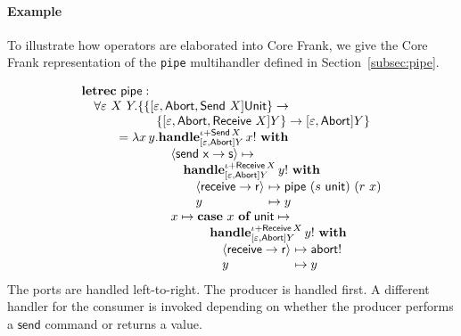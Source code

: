 \documentclass[12pt]{article}
\makeatletter
\newcommand\ba{\begin{array}}
\newcommand\ea{\end{array}}
\newcommand{\bl}{\ba[t]{@{}l@{}}}
\newcommand{\el}{\ea}
\newcommand{\effbox}[1]{[#1]}
\newcommand{\key}[1]{\textbf{#1}} %
\newcommand{\op}{\mathsf}  %
\newcommand{\con}{\mathsf} %
\newcommand{\inter}{\mathsf} %
\newcommand{\handleSymbol}{\rightarrow}
\newcommand{\handle}[2]{{#1} \handleSymbol {#2}}
\newcommand{\thunk}[1]{\{{#1}\}}
\newcommand{\evd}{\varepsilon}
\newcommand{\effin}[1]{\langle {#1} \rangle}
\newcommand{\id}{\iota}
\makeatother
\begin{document}
\paragraph{Example}
To illustrate how operators are elaborated into Core Frank, we give
the Core Frank representation of the \verb!pipe! multihandler defined
in Section~\ref{subsec:pipe}.

\[
\bl
\key{letrec}~
  \op{pipe} : \\
    \quad \forall \evd~X~Y. \{\bl
              \thunk{\effbox{\evd, \inter{Abort}, \inter{Send}~X}\con{Unit}} \to \\
              \quad \thunk{\effbox{\evd, \inter{Abort}, \inter{Receive}~X}Y} \to
                \effbox{\evd, \inter{Abort}}Y\} \\
              \el \\
\quad\qquad =
  \lambda x\,y.
    \bl
    \key{handle}^{\id + \inter{Send}\,X}_{\effbox{\evd, \inter{Abort}}Y}\,x!~\key{with} \\
       \ba{@{}r@{\quad}l@{}}
       &\op{\effin{\handle{\op{send}~x}{s}}} \mapsto \\
       &\quad
          \bl
          \key{handle}^{\id + \inter{Receive}\,X}_{\effbox{\evd, \inter{Abort}}Y}\,y!~\key{with} \\
            \ba{@{}r@{\quad}l@{~}l@{}}
                     &\op{\effin{\handle{\op{receive}}{r}}} &\mapsto \op{pipe}~(s~\op{unit})~(r~x) \\
            &y                                     &\mapsto y \\
            \ea \\
          \el \\
          &x \mapsto
             \bl
             \key{case}~x~\key{of}~\con{unit} \mapsto \\
             \quad \bl
                   \key{handle}^{\id + \inter{Receive}\,X}_{\effbox{\evd, \inter{Abort}}Y}\,y!~\key{with} \\
                      \ba{@{}r@{\quad}l@{~}l@{}}
                               &\op{\effin{\handle{\op{receive}}{r}}} &\mapsto \op{abort}! \\
                      &y                                     &\mapsto y \\
                      \ea \\
                   \el \\
             \el \\
       \ea \\
   \el \\
\el
\]
The ports are handled left-to-right. The producer is handled first. A
different handler for the consumer is invoked depending on whether the
producer performs a $\op{send}$ command or returns a value.
\end{document}
